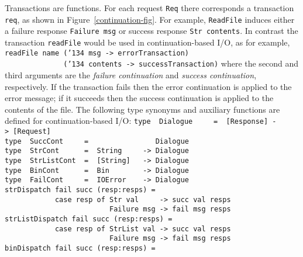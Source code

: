Transactions are functions.  For each request \mbox{\tt Req} there
corresponds a transaction \mbox{\tt req}, as shown in
Figure~\ref{continuation-fig}.  For example, \mbox{\tt ReadFile}
induces
either a failure response \mbox{\tt Failure\ msg} or success response 
\mbox{\tt Str\ contents}.  In contrast the transaction \mbox{\tt readFile} would be used
in continuation-based I/O, as for example,
\bprog
\mbox{\tt readFile\ name\ ({\char'134}\ msg\ ->\ errorTransaction)\ }\\
\mbox{\tt \ \ \ \ \ \ \ \ \ \ \ \ \ \ ({\char'134}\ contents\ ->\ successTransaction)}
\eprog
where the second and third arguments are the {\em failure
continuation} and {\em success continuation}, respectively.  If the
transaction fails then the error continuation is applied to the error
message; if it succeeds then the success continuation is applied to the
contents of the file.
The following type synonyms and auxiliary functions are defined for
continuation-based I/O:
\bprog
\mbox{\tt type\ \ Dialogue\ \ \ \ \ =\ \ [Response]\ ->\ [Request]}\\
\mbox{\tt type\ \ SuccCont\ \ \ \ \ =\ \ \ \ \ \ \ \ \ \ \ \ \ \ \ \ Dialogue}\\
\mbox{\tt type\ \ StrCont\ \ \ \ \ \ =\ \ String\ \ \ \ \ ->\ Dialogue}\\
\mbox{\tt type\ \ StrListCont\ \ =\ \ [String]\ \ \ ->\ Dialogue}\\
\mbox{\tt type\ \ BinCont\ \ \ \ \ \ =\ \ Bin\ \ \ \ \ \ \ \ ->\ Dialogue}\\
\mbox{\tt type\ \ FailCont\ \ \ \ \ =\ \ IOError\ \ \ \ ->\ Dialogue}
\eprogNoSkip%
%
%
%
\bprog
\mbox{\tt strDispatch\ fail\ succ\ (resp:resps)\ =\ }\\
\mbox{\tt \ \ \ \ \ \ \ \ \ \ \ \ case\ resp\ of\ Str\ val\ \ \ \ \ ->\ succ\ val\ resps}\\
\mbox{\tt \ \ \ \ \ \ \ \ \ \ \ \ \ \ \ \ \ \ \ \ \ \ \ \ \ Failure\ msg\ ->\ fail\ msg\ resps}\\
\mbox{\tt strListDispatch\ fail\ succ\ (resp:resps)\ =\ }\\
\mbox{\tt \ \ \ \ \ \ \ \ \ \ \ \ case\ resp\ of\ StrList\ val\ ->\ succ\ val\ resps}\\
\mbox{\tt \ \ \ \ \ \ \ \ \ \ \ \ \ \ \ \ \ \ \ \ \ \ \ \ \ Failure\ msg\ ->\ fail\ msg\ resps}\\
\mbox{\tt binDispatch\ fail\ succ\ (resp:resps)\ =\ }\\

